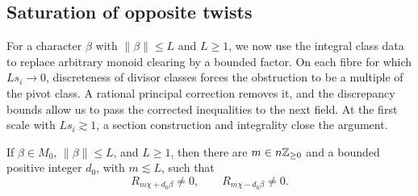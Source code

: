 \subsection{Saturation of opposite twists}

For a character $\beta$ with $\|\beta\|\le L$ and $L\ge1$, we now use
the integral class data to replace arbitrary monoid clearing by a bounded
factor. On each fibre for which $Ls_i\to0$, discreteness
of divisor classes forces the obstruction to be a multiple of the pivot
class. A rational principal correction removes it, and the discrepancy
bounds allow us to pass the corrected inequalities to the next field.
At the first scale with $Ls_i\gtrsim1$, a section construction and
integrality close the argument.

\begin{proposition}\label{b:twist-saturation}
If \(\beta\in M_0\), \(\|\beta\|\le L\), and \(L\ge1\), then
there are \(m\in n\mathbb Z_{\ge0}\) and a bounded positive integer
\(d_0\), with \(m\lesssim L\), such that
\begin{equation}\label{eq:C5}
                R_{m\chi+d_0\beta}\ne0,\qquad
                R_{m\chi-d_0\beta}\ne0 .
\end{equation}
\end{proposition}

